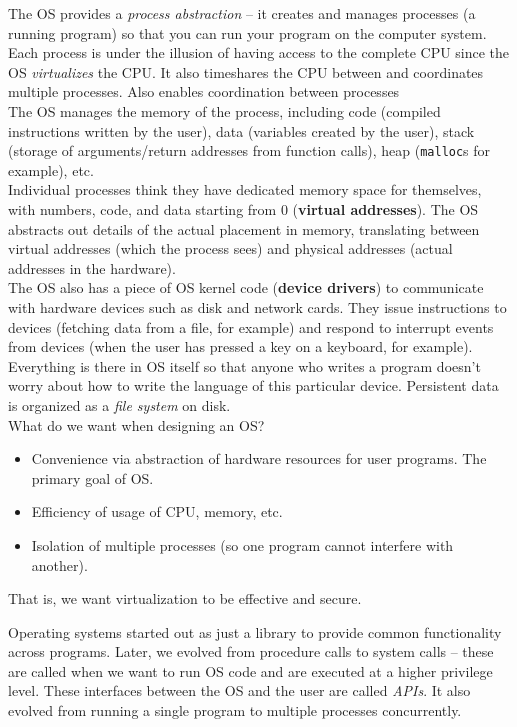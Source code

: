 \documentclass{article}
\begin{document}
		The OS provides a \emph{process abstraction} -- it creates and manages processes (a running program) so that you can run your program on the computer system. Each process is under the illusion of having access to the complete CPU since the OS \emph{virtualizes} the CPU. It also timeshares the CPU between and coordinates multiple processes. Also enables coordination between processes\\

		The OS manages the memory of the process, including code (compiled instructions written by the user), data (variables created by the user), stack (storage of arguments/return addresses from function calls), heap (\texttt{malloc}s for example), etc.\\
		Individual processes think they have dedicated memory space for themselves, with numbers, code, and data starting from $0$ (\textbf{virtual addresses}). The OS abstracts out details of the actual placement in memory, translating between virtual addresses (which the process sees) and physical addresses (actual addresses in the hardware).\\

		The OS also has a piece of OS kernel code (\textbf{device drivers}) to communicate with hardware devices such as disk and network cards. They issue instructions to devices (fetching data from a file, for example) and respond to interrupt events from devices (when the user has pressed a key on a keyboard, for example). Everything is there in OS itself so that anyone who writes a program doesn't worry about how to write the language of this particular device. Persistent data is organized as a \emph{file system} on disk.\\

		What do we want when designing an OS?
		\begin{itemize}
			\item Convenience via abstraction of hardware resources for user programs. The primary goal of OS.
			\item Efficiency of usage of CPU, memory, etc.
			\item Isolation of multiple processes (so one program cannot interfere with another).
		\end{itemize}
		That is, we want virtualization to be effective and secure.

		Operating systems started out as just a library to provide common functionality across programs. Later, we evolved from procedure calls to system calls -- these are called when we want to run OS code and are executed at a higher privilege level. These interfaces between the OS and the user are called \emph{APIs}. It also evolved from running a single program to multiple processes concurrently.
\end{document}
